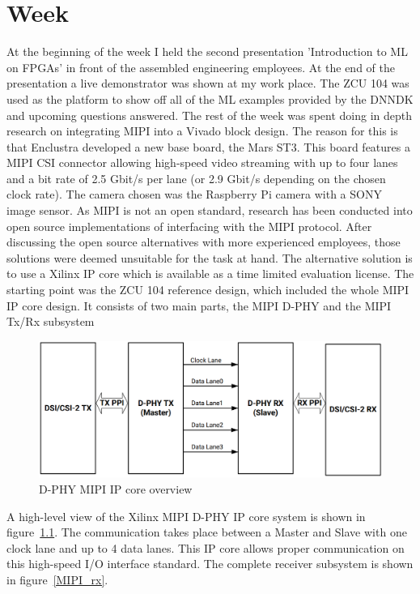 \chapter{Week}
At the beginning of the week I held the second presentation 'Introduction to \ac{ML} on \acp{FPGA}' in front of the assembled engineering employees. At the end of the presentation a live demonstrator was shown at my work place. The ZCU 104 was used as the platform to show off all of the \ac{ML} examples provided by the \ac{DNNDK} and upcoming questions answered. The rest of the week was spent doing in depth research on integrating \ac{MIPI} into a Vivado block design. The reason for this is that Enclustra developed a new base board, the Mars ST3. This board features a \ac{MIPI} \ac{CSI} connector allowing high-speed video streaming with up to four lanes and a bit rate of 2.5 Gbit/s per lane (or 2.9 Gbit/s depending on the chosen clock rate). The camera chosen was the Raspberry Pi camera with a SONY image sensor. As \ac{MIPI} is not an open standard, research has been conducted into open source implementations of interfacing with the \ac{MIPI} protocol. After discussing the open source alternatives with more experienced employees, those solutions were deemed unsuitable for the task at hand. The alternative solution is to use a Xilinx \ac{IP} core which is available as a time limited evaluation license. The starting point was the ZCU 104 reference design, which included the whole \ac{MIPI} \ac{IP} core design. It consists of two main parts, the \ac{MIPI} D-PHY and the \ac{MIPI} Tx/Rx subsystem
\begin{figure}[!htb]
	\centering
		\includegraphics[width=\textwidth]{bilder/MIPI_dphy.png}
		\caption{D-PHY \acs{MIPI} \acs{IP} core overview~\cite{mipi-dphy}}
		\label{fig:mipi_dphy}
\end{figure}
A high-level view of the Xilinx \ac{MIPI} D-PHY \ac{IP} core system is shown in figure~\ref{fig:mipi_dphy}. The communication takes place between a Master and Slave with one clock lane and up to 4 data lanes. This \ac{IP} core allows proper communication on this high-speed I/O interface standard. The complete receiver subsystem is shown in figure~\ref{MIPI_rx}.
